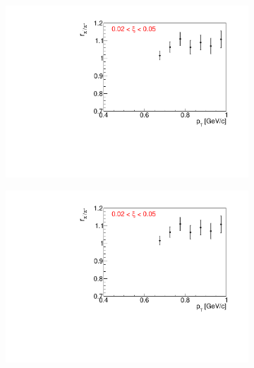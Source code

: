 \begin{figure}[h!]
	\centering
	\begin{subfigure}{.32\textwidth}
		\includegraphics[width=\linewidth, page=3]{chapters/chrgSTAR/img/dEdx/fit2019_fitResult_2_0_step_1.pdf}
	\end{subfigure}
	\begin{subfigure}{.32\textwidth}
		\includegraphics[width=\linewidth, page=4]{chapters/chrgSTAR/img/dEdx/fit2019_fitResult_2_0_step_1.pdf}
	\end{subfigure}
	\begin{subfigure}{.32\textwidth}

\end{subfigure}
\end{figure}
